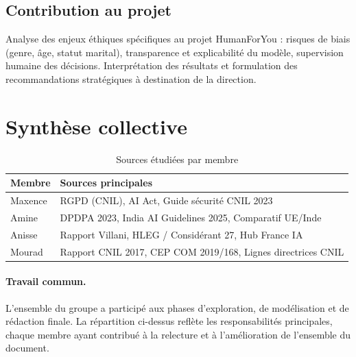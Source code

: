 \documentclass[12pt,a4paper]{article}
\begin{document}
\subsection{Contribution au projet}

Analyse des enjeux éthiques spécifiques au projet HumanForYou : risques de biais (genre, âge, statut marital), transparence et explicabilité du modèle, supervision humaine des décisions. Interprétation des résultats et formulation des recommandations stratégiques à destination de la direction.

\section{Synthèse collective}

\begin{table}[h!]
\centering
\caption{Sources étudiées par membre}
\small
\begin{tabularx}{\textwidth}{l X}
\toprule
\textbf{Membre} & \textbf{Sources principales} \\
\midrule
Maxence & RGPD (CNIL), AI Act, Guide sécurité CNIL 2023 \\
Amine & DPDPA 2023, India AI Guidelines 2025, Comparatif UE/Inde \\
Anisse & Rapport Villani, HLEG / Considérant 27, Hub France IA \\
Mourad & Rapport CNIL 2017, CEP COM 2019/168, Lignes directrices CNIL \\
\bottomrule
\end{tabularx}
\end{table}

\paragraph{Travail commun.}
L'ensemble du groupe a participé aux phases d'exploration, de modélisation et de rédaction finale. La répartition ci-dessus reflète les responsabilités principales, chaque membre ayant contribué à la relecture et à l'amélioration de l'ensemble du document.
\end{document}
